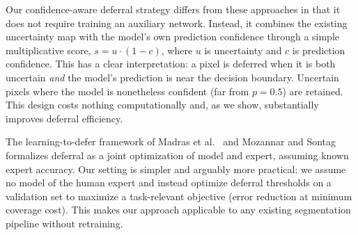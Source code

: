 Our confidence-aware deferral strategy differs from these approaches in that
it does not require training an auxiliary network. Instead, it combines the
existing uncertainty map with the model's own prediction confidence through a
simple multiplicative score, $s = u \cdot (1 - c)$, where $u$ is uncertainty
and $c$ is prediction confidence. This has a clear interpretation: a pixel
is deferred when it is both uncertain \emph{and} the model's prediction is
near the decision boundary. Uncertain pixels where the model is nonetheless
confident (far from $p = 0.5$) are retained. This design costs nothing
computationally and, as we show, substantially improves deferral efficiency.

The learning-to-defer framework of Madras et al.\ \citep{madras2018predict}
and Mozannar and Sontag \citep{mozannar2020consistent} formalizes deferral as
a joint optimization of model and expert, assuming known expert accuracy. Our
setting is simpler and arguably more practical: we assume no model of the
human expert and instead optimize deferral thresholds on a validation set to
maximize a task-relevant objective (error reduction at minimum coverage cost).
This makes our approach applicable to any existing segmentation pipeline
without retraining.
